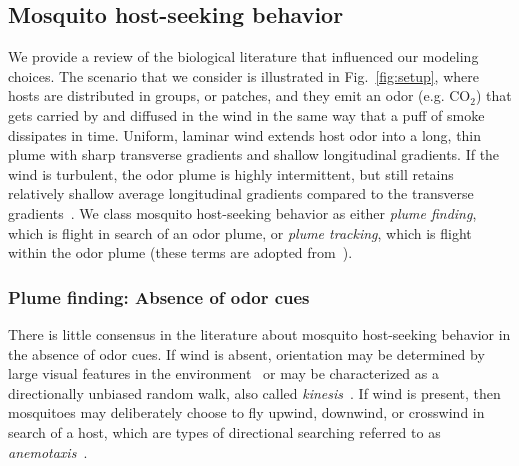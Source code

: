 \documentclass[10pt]{article}
\begin{document}
\subsection*{Mosquito host-seeking behavior}\label{sec:mosqbehav}

We provide a review of the biological literature that influenced our modeling choices. The scenario that we consider is illustrated in Fig.~\ref{fig:setup}, where hosts are distributed in groups, or patches, and they emit an odor (e.g. CO$_2$) that gets carried by and diffused in the wind in the same way that a puff of smoke dissipates in time. Uniform, laminar wind extends host odor into a long, thin plume with sharp transverse gradients and shallow longitudinal gradients. If the wind is turbulent, the odor plume is highly intermittent, but still retains relatively shallow average longitudinal gradients compared to the transverse
gradients~\cite{Vickers2000}.
We class mosquito host-seeking behavior as either
\textit{plume finding}, which is flight in search of an odor plume, or \textit{plume tracking}, which is flight within the odor plume (these terms are adopted from~\cite{Pasternak2009}).


\subsubsection*{Plume finding: Absence of odor cues}
There is little consensus in the literature about mosquito host-seeking behavior in the absence of odor cues. If wind is absent, orientation may be determined by large visual features in the
environment~\cite{Bidlingmayer1994} or may be characterized as a directionally unbiased random walk, also called \textit{kinesis}~\cite{OkumuModel2010}. If wind is present, then mosquitoes may deliberately choose to fly upwind, downwind, or crosswind in search of a host, which are types of directional searching referred to as \textit{anemotaxis}~\cite{Clements1999}.  
\end{document}
